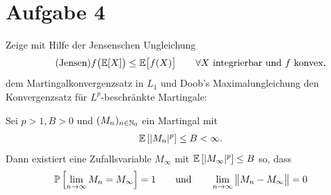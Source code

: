 \documentclass[12pt,a4paper]{article}
\begin{document}
\section*{Aufgabe 4}
Zeige mit Hilfe der Jensenschen Ungleichung
\begin{align}\label{eqJensenscheUngleichung}\tag{Jensen}
f\big(\mathbb{E}[X]\big)\leq\mathbb{E}\big[f(X)\big]\qquad\forall X\text{ integrierbar und $f$ konvex},
\end{align}
dem Martingalkonvergenzsatz in $L_1$ und Doob's Maximalungleichung den Konvergenzsatz für $L^p$-beschränkte Martingale:

\begin{theorem}\enter
Sei $p>1,B>0$ und $(M_n)_{n\in\mathbb{N}_0}$ ein Martingal mit 
\begin{align*}
\mathbb{E}\left[|M_n|^p\right]\leq B<\infty.
\end{align*}
Dann existiert eine Zufallsvariable $M_\infty$ mit $\mathbb{E}\left[|M_\infty|^p\right]\leq B$ so, dass
\begin{align*}
\mathbb{P}\left[\lim\limits_{n\to\infty} M_n=M_\infty\right]=1
\qquad\text{und}\qquad
\lim\limits_{n\to\infty}\big\Vert M_n-M_\infty\big\Vert=0
\end{align*}
\end{theorem}
\end{document}
